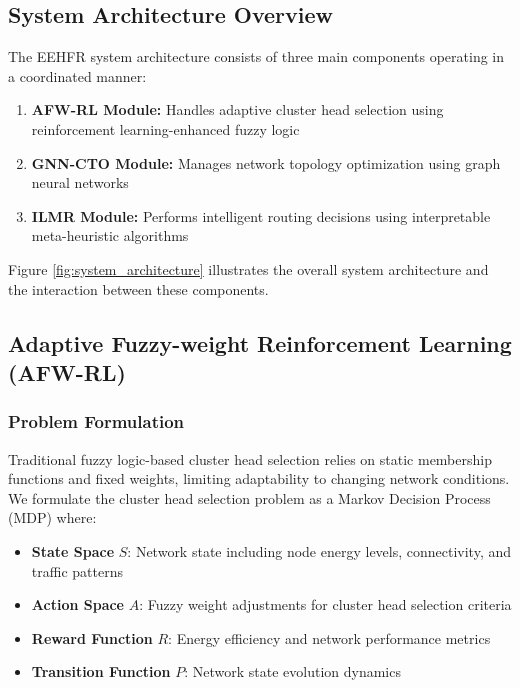 \documentclass[conference]{IEEEtran}
\begin{document}
\subsection{System Architecture Overview}

The EEHFR system architecture consists of three main components operating in a coordinated manner:

\begin{enumerate}
    \item \textbf{AFW-RL Module:} Handles adaptive cluster head selection using reinforcement learning-enhanced fuzzy logic
    \item \textbf{GNN-CTO Module:} Manages network topology optimization using graph neural networks
    \item \textbf{ILMR Module:} Performs intelligent routing decisions using interpretable meta-heuristic algorithms
\end{enumerate}

Figure \ref{fig:system_architecture} illustrates the overall system architecture and the interaction between these components.

\subsection{Adaptive Fuzzy-weight Reinforcement Learning (AFW-RL)}

\subsubsection{Problem Formulation}

Traditional fuzzy logic-based cluster head selection relies on static membership functions and fixed weights, limiting adaptability to changing network conditions. We formulate the cluster head selection problem as a Markov Decision Process (MDP) where:

\begin{itemize}
    \item \textbf{State Space} $S$: Network state including node energy levels, connectivity, and traffic patterns
    \item \textbf{Action Space} $A$: Fuzzy weight adjustments for cluster head selection criteria
    \item \textbf{Reward Function} $R$: Energy efficiency and network performance metrics
    \item \textbf{Transition Function} $P$: Network state evolution dynamics
\end{itemize}
\end{document}
